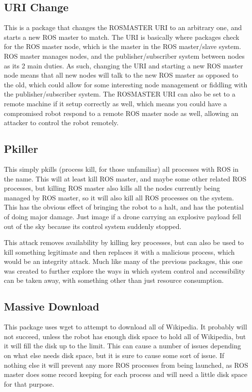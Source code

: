 \documentclass[IEEEtran,letterpaper,10pt,notitlepage,draftclsnofoot]{article}
\begin{document}
\subsection{URI Change}
This is a package that changes the ROSMASTER URI to an arbitrary one, and starts a new ROS master to match.
The URI is basically where packages check for the ROS master node, which is the master in the ROS master/slave system.
ROS master manages nodes, and the publisher/subscriber system between nodes as its 2 main duties.
As such, changing the URI and starting a new ROS master node means that all new nodes will talk to the new ROS master as 
opposed to the old, which could allow for some interesting node management or fiddling with the publisher/subscriber system.
The ROSMASTER URI can also be set to a remote machine if it setup correctly as well, which means you could have a compromised 
robot respond to a remote ROS master node as well, allowing an attacker to control the robot remotely.

\subsection{Pkiller}
This simply pkills (process kill, for those unfamiliar) all processes with ROS in the name.
This will at least kill ROS master, and maybe some other related ROS processes, but killing ROS master also kills all the nodes currently being managed by ROS master, so it will also kill all ROS processes on the system.
This has the obvious effect of bringing the robot to a halt, and has the potential of doing major damage.
Just image if a drone carrying an explosive payload fell out of the sky because its control system suddenly stopped.

This attack removes availability by killing key processes, but can also be used to kill something legitimate and then replaces it with a malicious process, which would be an integrity attack.
Much like many of the previous packages, this one was created to further explore the ways in which system control and accessibility can be taken away, with something other than just resource consumption.

\subsection{Massive Download}
This package uses wget to attempt to download all of Wikipedia.
It probably will not succeed, unless the robot has enough disk space to hold all of Wikipedia, but it will fill the disk up to 
the limit. This can cause a number of issues depending on what else needs disk space, but it is sure to cause some sort of 
issue. If nothing else it will prevent any more ROS processes from being launched, as ROS master does some record keeping for 
each process and will need a little disk space for that purpose.
\end{document}
